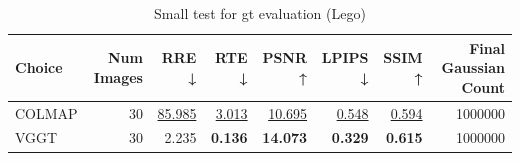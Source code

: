 \begin{table}[H]
\caption{Small test for gt evaluation (Lego)}
\label{tab:06_gt_lego}
\begin{tabular}{lrrrrrrr}
\toprule
Choice & Num Images & RRE ↓ & RTE ↓ & PSNR ↑ & LPIPS ↓ & SSIM ↑ & Final Gaussian Count \\
\midrule
COLMAP & 30 & \underline{85.985} & \underline{3.013} & \underline{10.695} & \underline{0.548} & \underline{0.594} & 1000000 \\
VGGT & 30 & 2.235 & \textbf{0.136} & \textbf{14.073} & \textbf{0.329} & \textbf{0.615} & 1000000 \\
\bottomrule
\end{tabular}
\end{table}
